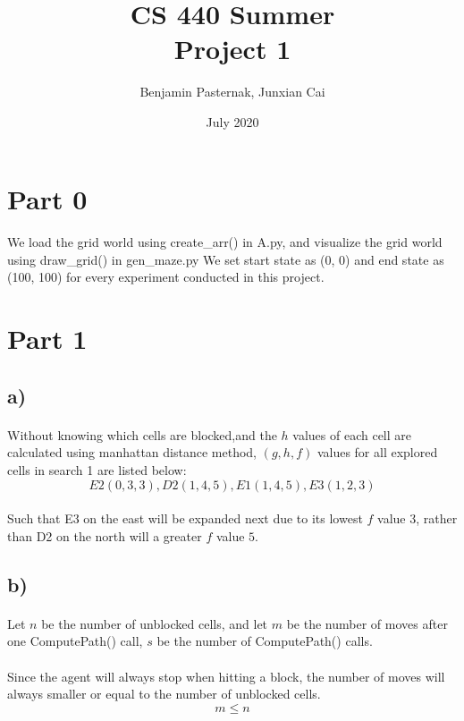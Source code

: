 \documentclass{article}
\title{CS 440 Summer \\ Project 1}
\author{Benjamin Pasternak, Junxian Cai}
\date{July 2020}
\begin{document}
\maketitle

\section*{Part 0}
\paragraph*{}
We load the grid world using create\_arr() in A.py, and visualize the grid world using draw\_grid() in gen\_maze.py We set start state as (0, 0) and end state as (100, 100) for every experiment conducted in this project.

\section*{Part 1}

\subsection*{a)}
\paragraph*{}
\raggedright
Without knowing which cells are blocked,and the $h$ values of each cell are calculated using manhattan distance method, $(g, h, f)$ values for all explored cells in search 1 are listed below:\\
$$E2(0, 3, 3), D2(1, 4, 5), E1(1, 4, 5), E3(1, 2, 3)$$
\paragraph*{}
Such that E3 on the east will be expanded next due to its lowest $f$ value $3$, rather than D2 on the north will a greater $f$ value $5$.

\subsection*{b)}
\paragraph*{}
Let $n$ be the number of unblocked cells, and let $m$ be the number of moves after one ComputePath() call, $s$ be the number of ComputePath() calls.

\paragraph*{}
Since the agent will always stop when hitting a block, the number of moves will always smaller or equal to the number of unblocked cells.
$$m \le n$$
\end{document}
